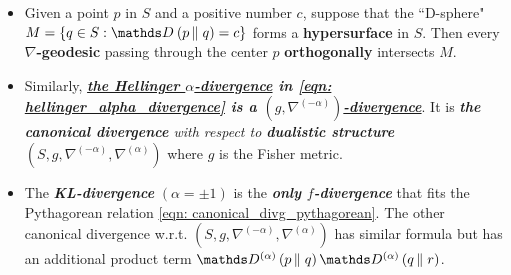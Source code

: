 \documentclass[11pt]{article}
\begin{document}
\begin{itemize}
\item \begin{corollary}
Given a point $p$ in $S$ and a positive number $c$, suppose that the ``D-sphere" $M = \{ q \in S:  \divg{}{p}{q} = c\}$ forms a \textbf{hypersurface} in $S$. Then every
\textbf{$\nabla$-geodesic} passing through the center $p$ \textbf{orthogonally} intersects $M$.
\end{corollary}

\item \begin{remark}
Similarly, \emph{\textbf{\underline{the Hellinger $\alpha$-divergence} in \eqref{eqn: hellinger_alpha_divergence} is a \underline{$(g, \nabla^{(-\alpha)})$-divergence}}}. It is \emph{\textbf{the canonical divergence} with respect to \textbf{dualistic structure}} $(S, g, \nabla^{(-\alpha)}, \nabla^{(\alpha)})$ where $g$ is the Fisher metric.
\end{remark}

\item \begin{remark}
The \emph{\textbf{KL-divergence}} $(\alpha = \pm 1)$ is the \emph{\textbf{only $f$-divergence}} that fits the Pythagorean relation \eqref{eqn: canonical_divg_pythagorean}. The other canonical divergence w.r.t. $(S, g, \nabla^{(-\alpha)}, \nabla^{(\alpha)})$ has similar formula but has an additional product term $\divg{(\alpha)}{p}{q}\divg{(\alpha)}{q}{r}$. 
\end{remark}

\end{itemize}


\newpage


\end{document}
